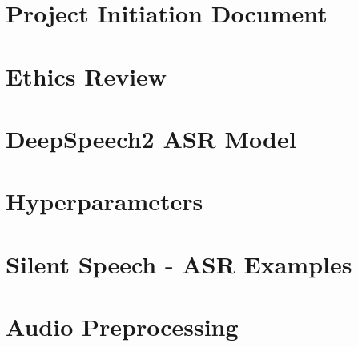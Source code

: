 \appendix


\chapter{Project Initiation Document}




\chapter{Ethics Review}



\chapter{DeepSpeech2 ASR Model}



\chapter{Hyperparameters}



\chapter{Silent Speech - ASR Examples}



\chapter{Audio Preprocessing}

